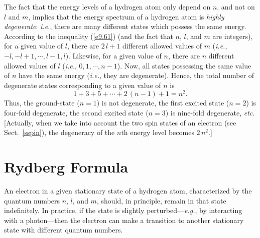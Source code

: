 The fact that the energy levels of a hydrogen atom only depend on $n$,
and not on $l$ and $m$, implies that the energy spectrum of a hydrogen
atom is {\em highly degenerate}: {\em i.e.}, there are many different
states which possess the same energy. According to the inequality
(\ref{e9.61}) (and the fact that $n$, $l$, and $m$ are integers), for
a given value of $l$, there are $2\,l+1$  different allowed values of $m$
({\em i.e.}, $-l,-l+1, \cdots, l-1, l$). Likewise, for a given value of $n$,
there are $n$ different allowed values of $l$ ({\em i.e.}, $0,1,\cdots, n-1$). Now,
all states possessing  the same value of $n$ have the same energy ({\em i.e.}, they are degenerate). Hence, the total number of
degenerate states corresponding to a given value of $n$ is
\begin{equation}
1 + 3 + 5 + \cdots +2\,(n-1)+1 = n^2.
\end{equation}
Thus, the ground-state ($n=1$) is not degenerate, the first excited
state ($n=2$) is four-fold degenerate, the second excited state
($n=3$) is nine-fold degenerate, {\em etc.}   [Actually, when we take
into account the two spin states of an electron (see Sect.~\ref{sspin}),
the degeneracy of the $n$th energy level becomes $2\,n^2$.]

\section{Rydberg Formula}
An electron in a given stationary state of a hydrogen atom, characterized
by the quantum numbers $n$, $l$, and $m$, should, in principle,
remain in that state indefinitely. In practice, if the state is slightly
perturbed---{\em e.g.}, by interacting with a photon---then the electron can make a transition to another stationary
state with different quantum numbers.%

